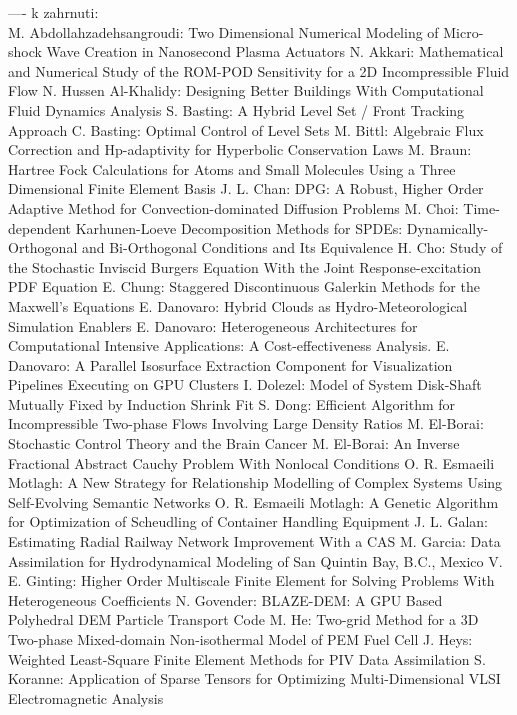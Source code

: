 \documentclass[10pt, A4]{article}%
\begin{document}
---- k zahrnuti:\\
{M. Abdollahzadehsangroudi}: {Two Dimensional Numerical Modeling of Micro-shock Wave Creation in Nanosecond Plasma Actuators}
{N. Akkari}: {Mathematical and Numerical Study of the ROM-POD Sensitivity for a 2D Incompressible Fluid Flow}
{N. Hussen Al-Khalidy}: {Designing Better Buildings With Computational Fluid Dynamics Analysis}
{S. Basting}: {A Hybrid Level Set / Front Tracking Approach}
{C. Basting}: {Optimal Control of Level Sets}
{M. Bittl}: {Algebraic Flux Correction and Hp-adaptivity for Hyperbolic Conservation Laws}
{M. Braun}: {Hartree Fock Calculations for Atoms and Small Molecules Using  a Three Dimensional  Finite Element Basis}
{J. L. Chan}: {DPG: A Robust, Higher Order Adaptive Method for Convection-dominated Diffusion Problems}
{M. Choi}: {Time-dependent Karhunen-Loeve Decomposition Methods for SPDEs: Dynamically-Orthogonal and Bi-Orthogonal Conditions and Its Equivalence}
{H. Cho}: {Study of the Stochastic Inviscid Burgers Equation With the Joint Response-excitation PDF Equation}
{E. Chung}: {Staggered Discontinuous Galerkin Methods for the Maxwell's Equations}
{E. Danovaro}: {Hybrid Clouds as Hydro-Meteorological Simulation Enablers}
{E. Danovaro}: {Heterogeneous Architectures for Computational Intensive Applications: A Cost-effectiveness Analysis.}
{E. Danovaro}: {A Parallel Isosurface Extraction Component for Visualization Pipelines Executing on GPU Clusters}
{I. Dolezel}: {Model of System Disk-Shaft Mutually Fixed by Induction Shrink Fit}
{S. Dong}: {Efficient Algorithm for Incompressible Two-phase Flows Involving Large Density Ratios}
{M. El-Borai}: {Stochastic Control Theory and the Brain Cancer}
{M. El-Borai}: {An Inverse Fractional Abstract Cauchy Problem With Nonlocal Conditions}
{O. R. Esmaeili Motlagh}: {A New Strategy for Relationship Modelling of Complex Systems Using Self-Evolving Semantic Networks}
{O. R. Esmaeili Motlagh}: {A Genetic Algorithm for Optimization of Scheudling of Container Handling Equipment}
{J. L. Galan}: {Estimating Radial Railway Network Improvement With a CAS}
{M. Garcia}: {Data Assimilation for Hydrodynamical Modeling of San Quintin Bay, B.C., Mexico}
{V. E. Ginting}: {Higher Order Multiscale Finite Element for Solving Problems With Heterogeneous Coefficients}
{N. Govender}: {BLAZE-DEM: A GPU Based Polyhedral DEM Particle Transport Code}
{M. He}: {Two-grid Method for a 3D Two-phase Mixed-domain Non-isothermal Model of PEM Fuel Cell}
{J. Heys}: {Weighted Least-Square Finite Element Methods for PIV Data Assimilation}
{S. Koranne}: {Application of Sparse Tensors for Optimizing Multi-Dimensional VLSI Electromagnetic Analysis}
\end{document}
